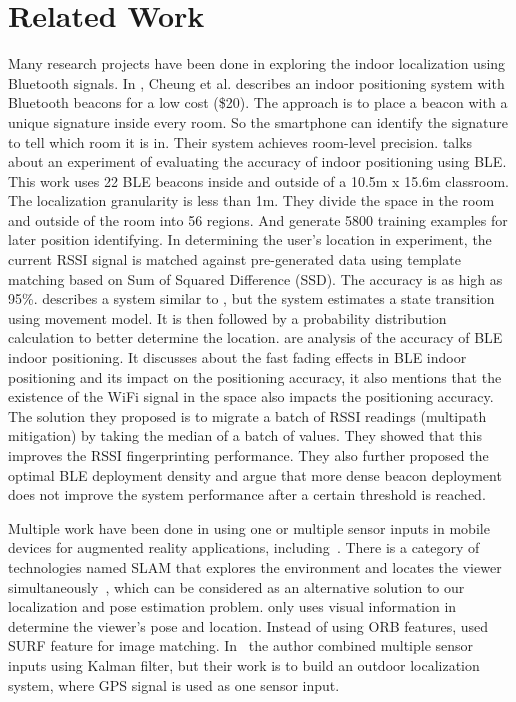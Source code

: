 \section{Related Work}
\label{sec:related}
Many research projects have been done in exploring the indoor localization using Bluetooth signals. In \cite{cheung2006inexpensive}, Cheung et al. describes an indoor positioning system with Bluetooth beacons for a low cost (\$20). The approach is to place a beacon with a unique signature inside every room. So the smartphone can identify the signature to tell which room it is in. Their system achieves room-level precision. \cite{kajioka2014experiment} talks about an experiment of evaluating the accuracy of indoor positioning using BLE. This work uses 22 BLE beacons inside and outside of a 10.5m x 15.6m classroom. The localization granularity is less than 1m. They divide the space in the room and outside of the room into 56 regions. And generate 5800 training examples for later position identifying. In determining the user's location in experiment, the current RSSI signal is matched against pre-generated data using template matching based on Sum of Squared Difference (SSD). The accuracy is as high as 95\%. \cite{inoue2009indoor} describes a system similar to \cite{kajioka2014experiment}, but the system estimates a state transition using movement model. It is then followed by a probability distribution calculation to better determine the location. \cite{faragher2014analysis,faragher2015location} are analysis of the accuracy of BLE indoor positioning. It discusses about the fast fading effects in BLE indoor positioning and its impact on the positioning accuracy, it also mentions that the existence of the WiFi signal in the space also impacts the positioning accuracy. The solution they proposed is to migrate a batch of RSSI readings (multipath mitigation) by taking the median of a batch of values. They showed that this improves the RSSI fingerprinting performance. They also further proposed the optimal BLE deployment density and argue that more dense beacon deployment does not improve the system performance after a certain threshold is reached.

Multiple work have been done in using one or multiple sensor inputs in mobile devices for augmented reality applications, including~\cite{ababsa2009advanced, al2013indoor, deniz2014vision, guan2016vision, dissanayake2001solution, aulinas2008slam}. There is a category of technologies named SLAM that explores the environment and locates the viewer simultaneously~\cite{dissanayake2001solution, aulinas2008slam}, which can be considered as an alternative solution to our localization and pose estimation problem. \cite{deniz2014vision, guan2016vision} only uses visual information in determine the viewer's pose and location. Instead of using ORB features, \cite{guan2016vision} used SURF feature for image matching. In~\cite{ababsa2009advanced} the author combined multiple sensor inputs using Kalman filter, but their work is to build an outdoor localization system, where GPS signal is used as one sensor input.
